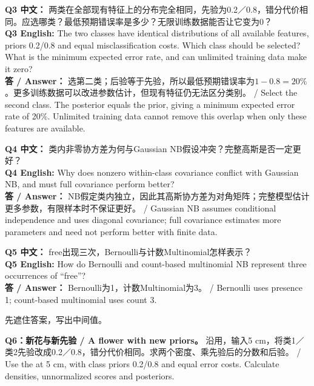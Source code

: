 \textbf{Q3 中文：} 两类在全部现有特征上的分布完全相同，先验为0.2／0.8，错分代价相同。应选哪类？最低预期错误率是多少？无限训练数据能否让它变为0？\\

\textbf{Q3 English:} The two classes have identical distributions of all available features, priors 0.2/0.8 and equal misclassification costs. Which class should be selected? What is the minimum expected error rate, and can unlimited training data make it zero?\\

\textbf{答 / Answer：} 选第二类；后验等于先验，所以最低预期错误率为\(1-0.8=20\%\)。更多训练数据可以改进参数估计，但现有特征仍无法区分类别。 / Select the second class. The posterior equals the prior, giving a minimum expected error rate of 20\%. Unlimited training data cannot remove this overlap when only these features are available.


\textbf{Q4 中文：} 类内非零协方差为何与Gaussian NB假设冲突？完整高斯是否一定更好？\\

\textbf{Q4 English:} Why does nonzero within-class covariance conflict with Gaussian NB, and must full covariance perform better?\\

\textbf{答 / Answer：} NB假定类内独立，因此其高斯协方差为对角矩阵；完整模型估计更多参数，有限样本时不保证更好。 / Gaussian NB assumes conditional independence and uses diagonal covariance; full covariance estimates more parameters and need not perform better with finite data.


\textbf{Q5 中文：} free出现三次，Bernoulli与计数Multinomial怎样表示？\\

\textbf{Q5 English:} How do Bernoulli and count-based multinomial NB represent three occurrences of “free”?\\

\textbf{答 / Answer：} Bernoulli为1，计数Multinomial为3。 / Bernoulli uses presence 1; count-based multinomial uses count 3.





先遮住答案，写出中间值。


\textbf{Q6：新花与新先验 / A flower with new priors。} 沿用，输入5 cm，将类1／类2先验改成0.2／0.8，错分代价相同。求两个密度、乘先验后的分数和后验。 / Use the  at 5 cm, with class priors 0.2/0.8 and equal error costs. Calculate densities, unnormalized scores and posteriors.



